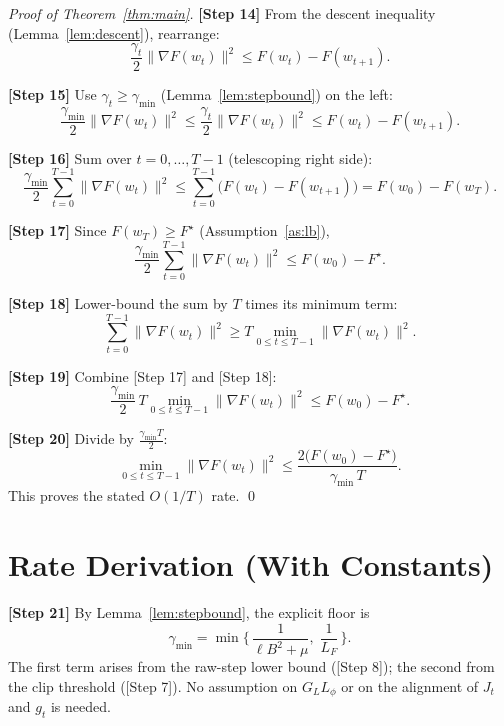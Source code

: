 \documentclass[11pt]{article}
\begin{document}
\begin{proof}[Proof of Theorem~\ref{thm:main}]

\textbf{[Step 14]} From the descent inequality (Lemma~\ref{lem:descent}),
rearrange:
\[
\frac{\gamma_t}{2}\|\nabla F(w_t)\|^2 \le F(w_t) - F(w_{t+1}).
\]

\textbf{[Step 15]} Use $\gamma_t \ge \gamma_{\min}$ (Lemma~\ref{lem:stepbound})
on the left:
\[
\frac{\gamma_{\min}}{2}\|\nabla F(w_t)\|^2
\le \frac{\gamma_t}{2}\|\nabla F(w_t)\|^2
\le F(w_t) - F(w_{t+1}).
\]

\textbf{[Step 16]} Sum over $t = 0,\dots,T-1$ (telescoping right side):
\[
\frac{\gamma_{\min}}{2}\sum_{t=0}^{T-1}\|\nabla F(w_t)\|^2
\le \sum_{t=0}^{T-1}\big(F(w_t)-F(w_{t+1})\big)
= F(w_0) - F(w_T).
\]

\textbf{[Step 17]} Since $F(w_T)\ge F^\star$ (Assumption~\ref{as:lb}),
\[
\frac{\gamma_{\min}}{2}\sum_{t=0}^{T-1}\|\nabla F(w_t)\|^2
\le F(w_0) - F^\star .
\]

\textbf{[Step 18]} Lower-bound the sum by $T$ times its minimum term:
\[
\sum_{t=0}^{T-1}\|\nabla F(w_t)\|^2
\ge T \min_{0\le t\le T-1}\|\nabla F(w_t)\|^2 .
\]

\textbf{[Step 19]} Combine [Step 17] and [Step 18]:
\[
\frac{\gamma_{\min}}{2}\, T \min_{0\le t\le T-1}\|\nabla F(w_t)\|^2
\le F(w_0) - F^\star .
\]

\textbf{[Step 20]} Divide by $\tfrac{\gamma_{\min} T}{2}$:
\[
\min_{0\le t\le T-1}\|\nabla F(w_t)\|^2
\le \frac{2\big(F(w_0)-F^\star\big)}{\gamma_{\min}\, T}.
\]
This proves the stated $O(1/T)$ rate. \qed
\end{proof}

\section*{Rate Derivation (With Constants)}


\textbf{[Step 21]} By Lemma~\ref{lem:stepbound}, the explicit floor is
\[
\gamma_{\min} = \min\Big\{\, \frac{1}{\ell B^2 + \mu},\; \frac{1}{L_F} \,\Big\}.
\]
The first term arises from the raw-step lower bound ([Step 8]); the second from
the clip threshold ([Step 7]). No assumption on $G_L L_\phi$ or on the alignment
of $J_t$ and $g_t$ is needed.
\end{document}
